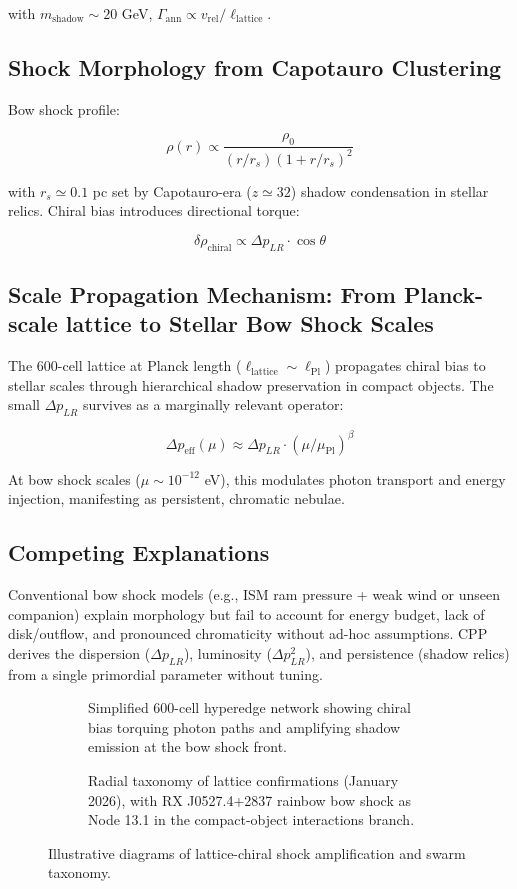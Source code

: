 \documentclass[11pt]{article}
\begin{document}
with $m_{\text{shadow}} \sim 20$ GeV, $\Gamma_{\text{ann}} \propto v_{\text{rel}} / \ell_{\text{lattice}}$.

\subsection{Shock Morphology from Capotauro Clustering}
Bow shock profile:

\[
\rho(r) \propto \frac{\rho_0}{(r/r_s)(1 + r/r_s)^2}
\]

with $r_s \simeq 0.1$ pc set by Capotauro-era ($z \simeq 32$) shadow condensation in stellar relics. Chiral bias introduces directional torque:

\[
\delta \rho_{\text{chiral}} \propto \Delta p_{LR} \cdot \cos\theta
\]

\subsection{Scale Propagation Mechanism: From Planck-scale lattice to Stellar Bow Shock Scales}
The 600-cell lattice at Planck length ($\ell_{\text{lattice}} \sim \ell_{\text{Pl}}$) propagates chiral bias to stellar scales through hierarchical shadow preservation in compact objects. The small $\Delta p_{LR}$ survives as a marginally relevant operator:

\[
\Delta p_{\text{eff}}(\mu) \approx \Delta p_{LR} \cdot (\mu / \mu_{\text{Pl}})^\beta
\]

At bow shock scales ($\mu \sim 10^{-12}$ eV), this modulates photon transport and energy injection, manifesting as persistent, chromatic nebulae.

\subsection{Competing Explanations}
Conventional bow shock models (e.g., ISM ram pressure + weak wind or unseen companion) explain morphology but fail to account for energy budget, lack of disk/outflow, and pronounced chromaticity without ad-hoc assumptions. CPP derives the dispersion ($\Delta p_{LR}$), luminosity ($\Delta p_{LR}^2$), and persistence (shadow relics) from a single primordial parameter without tuning.

\begin{figure}[htbp]
\centering
\begin{subfigure}{0.45\textwidth}
\centering
\caption{Simplified 600-cell hyperedge network showing chiral bias torquing photon paths and amplifying shadow emission at the bow shock front.}
\label{fig:chiral-shock}
\end{subfigure}
\hfill
\begin{subfigure}{0.45\textwidth}
\centering
\caption{Radial taxonomy of lattice confirmations (January 2026), with RX J0527.4+2837 rainbow bow shock as Node 13.1 in the compact-object interactions branch.}
\label{fig:taxonomy}
\end{subfigure}
\caption{Illustrative diagrams of lattice-chiral shock amplification and swarm taxonomy.}
\end{figure}
\end{document}

